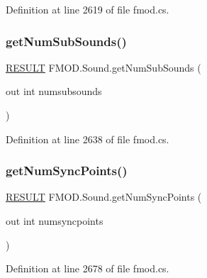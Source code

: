 Definition at line 2619 of file fmod.\+cs.

\mbox{\label{class_f_m_o_d_1_1_sound_ad706757c6faea248669db0c346e346b2}} 
\subsubsection{\texorpdfstring{get\+Num\+Sub\+Sounds()}{getNumSubSounds()}}
{\footnotesize\ttfamily \hyperlink{namespace_f_m_o_d_a305d1176ef3f8c8815861a60407ac33d}{R\+E\+S\+U\+LT} F\+M\+O\+D.\+Sound.\+get\+Num\+Sub\+Sounds (\begin{DoxyParamCaption}\item[{out int}]{numsubsounds }\end{DoxyParamCaption})}



Definition at line 2638 of file fmod.\+cs.

\mbox{\label{class_f_m_o_d_1_1_sound_ad71e361cb6405b056802505d6487cc7f}} 
\subsubsection{\texorpdfstring{get\+Num\+Sync\+Points()}{getNumSyncPoints()}}
{\footnotesize\ttfamily \hyperlink{namespace_f_m_o_d_a305d1176ef3f8c8815861a60407ac33d}{R\+E\+S\+U\+LT} F\+M\+O\+D.\+Sound.\+get\+Num\+Sync\+Points (\begin{DoxyParamCaption}\item[{out int}]{numsyncpoints }\end{DoxyParamCaption})}



Definition at line 2678 of file fmod.\+cs.

\mbox{\label{class_f_m_o_d_1_1_sound_ab27425821f31a3604111036436e7f165}} 
